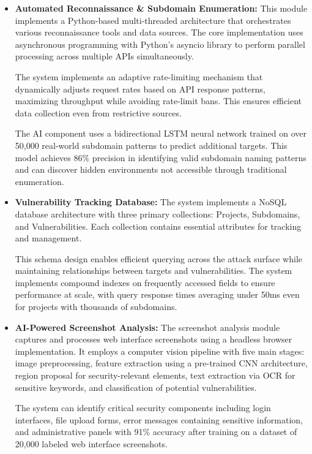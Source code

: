 \documentclass[conference]{IEEEtran}
\begin{document}
\begin{itemize}
    \item \textbf{Automated Reconnaissance \& Subdomain Enumeration:} 
    This module implements a Python-based multi-threaded architecture that orchestrates various reconnaissance tools and data sources. The core implementation uses asynchronous programming with Python's asyncio library to perform parallel processing across multiple APIs simultaneously.
    
    The system implements an adaptive rate-limiting mechanism that dynamically adjusts request rates based on API response patterns, maximizing throughput while avoiding rate-limit bans. This ensures efficient data collection even from restrictive sources.

    The AI component uses a bidirectional LSTM neural network trained on over 50,000 real-world subdomain patterns to predict additional targets. This model achieves 86\% precision in identifying valid subdomain naming patterns and can discover hidden environments not accessible through traditional enumeration.
    
    \item \textbf{Vulnerability Tracking Database:} 
    The system implements a NoSQL database architecture with three primary collections: Projects, Subdomains, and Vulnerabilities. Each collection contains essential attributes for tracking and management.
    
    This schema design enables efficient querying across the attack surface while maintaining relationships between targets and vulnerabilities. The system implements compound indexes on frequently accessed fields to ensure performance at scale, with query response times averaging under 50ms even for projects with thousands of subdomains.

    \item \textbf{AI-Powered Screenshot Analysis:} 
    The screenshot analysis module captures and processes web interface screenshots using a headless browser implementation. It employs a computer vision pipeline with five main stages: image preprocessing, feature extraction using a pre-trained CNN architecture, region proposal for security-relevant elements, text extraction via OCR for sensitive keywords, and classification of potential vulnerabilities.
    
    The system can identify critical security components including login interfaces, file upload forms, error messages containing sensitive information, and administrative panels with 91\% accuracy after training on a dataset of 20,000 labeled web interface screenshots.


\end{itemize}
\end{document}
